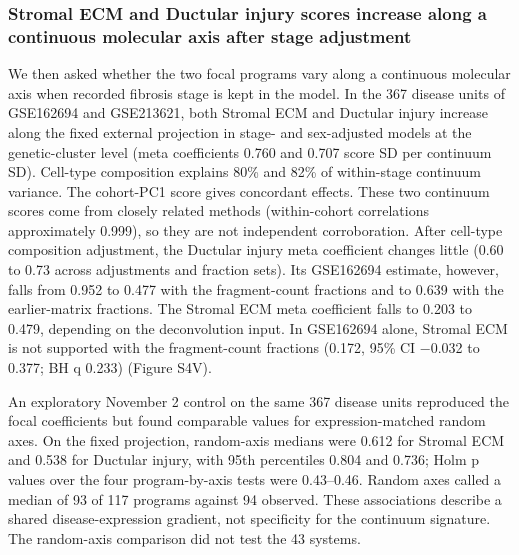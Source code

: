 \subsubsection{Stromal ECM and Ductular injury scores increase along a continuous molecular axis after stage adjustment}\label{stromal-ecm-and-ductular-injury-scores-increase-along-a-continuous-molecular-axis-after-stage-adjustment}

We then asked whether the two focal programs vary along a continuous molecular axis when recorded fibrosis stage is kept in the model. In the 367 disease units of GSE162694 and GSE213621, both Stromal ECM and Ductular injury increase along the fixed external projection in stage- and sex-adjusted models at the genetic-cluster level (meta coefficients 0.760 and 0.707 score SD per continuum SD). Cell-type composition explains 80\% and 82\% of within-stage continuum variance. The cohort-PC1 score gives concordant effects. These two continuum scores come from closely related methods (within-cohort correlations approximately 0.999), so they are not independent corroboration. After cell-type composition adjustment, the Ductular injury meta coefficient changes little (0.60 to 0.73 across adjustments and fraction sets). Its GSE162694 estimate, however, falls from 0.952 to 0.477 with the fragment-count fractions and to 0.639 with the earlier-matrix fractions. The Stromal ECM meta coefficient falls to 0.203 to 0.479, depending on the deconvolution input. In GSE162694 alone, Stromal ECM is not supported with the fragment-count fractions (0.172, 95\% CI −0.032 to 0.377; BH q 0.233) (Figure S4V).

An exploratory November 2 control on the same 367 disease units reproduced the focal coefficients but found comparable values for expression-matched random axes. On the fixed projection, random-axis medians were 0.612 for Stromal ECM and 0.538 for Ductular injury, with 95th percentiles 0.804 and 0.736; Holm p values over the four program-by-axis tests were 0.43--0.46. Random axes called a median of 93 of 117 programs against 94 observed. These associations describe a shared disease-expression gradient, not specificity for the continuum signature. The random-axis comparison did not test the 43 systems.

